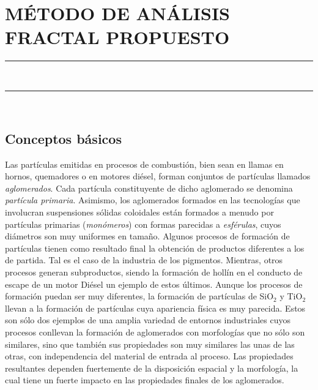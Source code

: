 \pagestyle{plain}
\chapter{MÉTODO DE ANÁLISIS FRACTAL PROPUESTO}\label{cap:MetodosAnalisisFractal}
\vspace{0.2cm}
\noindent\rule{\linewidth}{1.5pt}\\
\startcontents[chapters]
\vspace{0.2cm}
\noindent\rule{\linewidth}{1.3pt}\\
\newpage
\section{Conceptos básicos}\label{sec:ConceptosBasicos}
\par Las partículas emitidas en procesos de combustión, bien sean en llamas en hornos, quemadores o en motores diésel, forman conjuntos de partículas llamados  \emph{aglomerados}. Cada partícula constituyente de dicho aglomerado se denomina  \emph{partícula primaria}. Asimismo, los aglomerados formados en las tecnologías que involucran suspensiones sólidas coloidales están formados a menudo por partículas primarias (\emph{monómeros}) con formas parecidas a  \emph{esférulas}, cuyos diámetros son muy uniformes en tamaño. Algunos procesos de formación de partículas tienen como resultado final la obtención de productos diferentes a los de partida. Tal es el caso de la industria de los pigmentos. Mientras, otros procesos generan subproductos, siendo la formación de hollín en el conducto de escape de un motor Diésel un ejemplo de estos últimos. Aunque los procesos de formación puedan ser muy diferentes, la formación de partículas de SiO$_2$ y TiO$_2$ llevan a la formación de partículas cuya apariencia física es muy parecida. Estos son sólo dos ejemplos de una amplia variedad de entornos industriales cuyos procesos conllevan la formación de aglomerados con morfologías que no sólo son similares, sino que también sus propiedades son muy similares las unas de las otras, con independencia del material de entrada al proceso. Las propiedades resultantes dependen fuertemente de la disposición espacial y la morfología, la cual tiene un fuerte impacto en las propiedades finales de los aglomerados.

